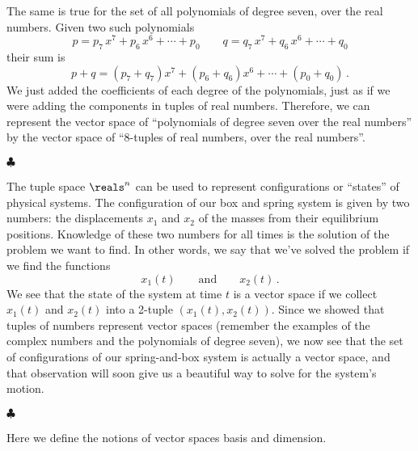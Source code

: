 The same is true for the set of all polynomials of degree seven, over the real numbers.
Given two such polynomials
\begin{equation*}
  p = p_7 \, x^7 + p_6 \, x^6 + \cdots + p_0 \qquad
  q = q_7 \, x^7 + q_6 \, x^6 + \cdots + q_0
\end{equation*}
their sum is
\begin{equation*}
  p + q = (p_7 + q_7) x^7 + (p_6 + q_6)x^6 + \cdots + (p_0 + q_0)
  \, .
\end{equation*}
We just added the coefficients of each degree of the polynomials, just as if we were adding the components in tuples of real numbers.
Therefore, we can represent the vector space of ``polynomials of degree seven over the real numbers'' by the vector space of ``8-tuples of real numbers, over the real numbers''.

\begin{flushleft} $\clubsuit$ \end{flushleft}
The tuple space $\reals^n$ can be used to represent configurations or ``states'' of physical systems.
The configuration of our box and spring system is given by two numbers: the displacements $x_1$ and $x_2$ of the masses from their equilibrium positions.
Knowledge of these two numbers for all times is the solution of the problem we want to find.
In other words, we say that we've solved the problem if we find the functions
\begin{equation*}
  x_1(t) \qquad \textrm{and} \qquad x_2(t) \, .
\end{equation*}
We see that the state of the system at time $t$ is a vector space if we collect $x_1(t)$ and $x_2(t)$ into a 2-tuple $(x_1(t), x_2(t))$.
Since we showed that tuples of numbers represent vector spaces (remember the examples of the complex numbers and the polynomials of degree seven), we now see that the set of configurations of our spring-and-box system is actually a vector space, and that observation will soon give us a beautiful way to solve for the system's motion.
\begin{flushright} $\clubsuit$ \end{flushright}


Here we define the notions of vector spaces basis and dimension.

